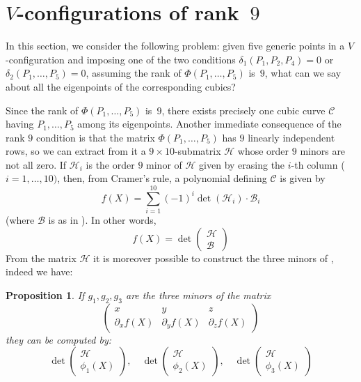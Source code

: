 \documentclass{amsart}
\theoremstyle{plain}
\newtheorem{prop}[lemma]{Proposition}
\theoremstyle{definition}
\newcommand{\de}{\partial}
\newcommand{\cbc}{\ensuremath{\mathcal{C}}}
\begin{document}
\section{\texorpdfstring{$V$}{V}-configurations of rank~\texorpdfstring{$9$}{9}}
\label{rank_9}

In this section, we consider the following problem:
given five generic points in a $V$-configuration and imposing one
of the two conditions
$\delta_1(P_1, P_2, P_4) = 0$ or $\delta_2(P_1, \dots, P_5) = 0$, assuming the rank of $\Phi(P_1, \dots, P_5)$ is~$9$, what can we say about all the eigenpoints of the corresponding cubics?

Since the rank of $\Phi(P_1, \dots, P_5)$ is~$9$, there exists precisely one cubic curve $\cbc$ having $P_1, \dots, P_5$ among its eigenpoints. Another immediate consequence of the rank $9$ condition is that the
matrix $\Phi(P_1, \dots, P_5)$ has $9$ linearly independent rows, so
we can extract from it a $9 \times 10$-submatrix
$\mathcal{H}$ whose order $9$ minors are not all zero. If
$\mathcal{H}_i$ is the order $9$ minor of
$\mathcal{H}$ given by erasing the $i$-th column ($i=1, \dots, 10)$, then,
from Cramer's rule, a polynomial defining $\cbc$ is given by
\[
 f(X) = \sum_{i=1}^{10}(-1)^i\det(\mathcal{H}_i)\cdot \mathcal{B}_i
\]
(where $\mathcal{B}$ is as in ). In other words,
\[
f(X) = \det \left( \begin{array}{c} \mathcal{H}\\ \mathcal{B}
 \end{array} \right)
\]
From the matrix $\mathcal{H}$ it is moreover possible to construct
the three minors of , indeed we have:
\begin{prop}
\label{proposition:geiser1}
If $g_1, g_2, g_3$ are the three minors of the matrix
\[
\left(
\begin{array}{ccc}
x & y & z \\
\de_x f(X) & \de_y f(X) & \de_z f(X)
\end{array}
\right)
\]
they can be computed by:
\[
\det \left( \begin{array}{c} \mathcal{H}\\
\phi_1(X)
\end{array} \right),\quad
\det \left( \begin{array}{c} \mathcal{H}\\
\phi_2(X)
\end{array} \right), \quad
\det \left( \begin{array}{c} \mathcal{H}\\
\phi_3(X)
\end{array} \right)
\]
\end{prop}
\end{document}
